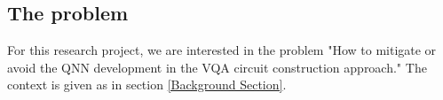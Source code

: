 \subsection{The problem}
For this research project, we are interested in the problem "How to mitigate or avoid the QNN development in the VQA circuit construction approach." The context is given as in section \ref{Background Section}.